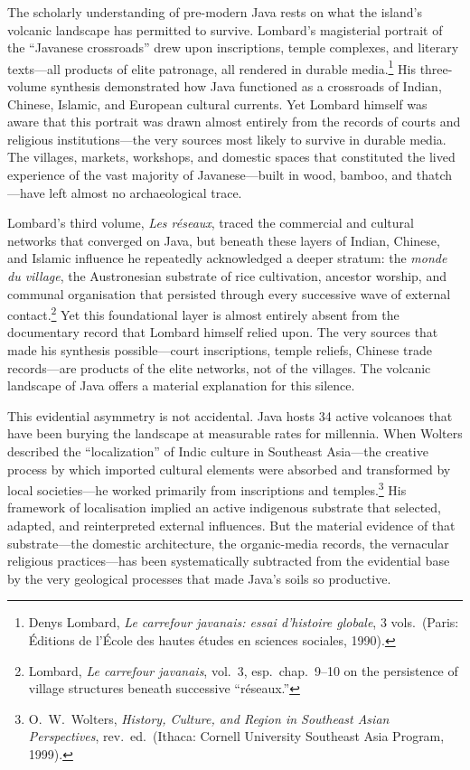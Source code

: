\documentclass[12pt,a4paper]{article}
\begin{document}
The scholarly understanding of pre-modern Java rests on what the island's volcanic landscape has permitted to survive.
Lombard's magisterial portrait of the ``Javanese crossroads'' drew upon inscriptions, temple complexes, and literary texts---all products of elite patronage, all rendered in durable media.\footnote{Denys Lombard, \emph{Le carrefour javanais: essai d'histoire globale}, 3 vols.\ (Paris: \'{E}ditions de l'\'{E}cole des hautes \'{e}tudes en sciences sociales, 1990).}
His three-volume synthesis demonstrated how Java functioned as a crossroads of Indian, Chinese, Islamic, and European cultural currents.
Yet Lombard himself was aware that this portrait was drawn almost entirely from the records of courts and religious institutions---the very sources most likely to survive in durable media.
The villages, markets, workshops, and domestic spaces that constituted the lived experience of the vast majority of Javanese---built in wood, bamboo, and thatch---have left almost no archaeological trace.

Lombard's third volume, \emph{Les r\'{e}seaux}, traced the commercial and cultural networks that converged on Java, but beneath these layers of Indian, Chinese, and Islamic influence he repeatedly acknowledged a deeper stratum: the \emph{monde du village}, the Austronesian substrate of rice cultivation, ancestor worship, and communal organisation that persisted through every successive wave of external contact.\footnote{Lombard, \emph{Le carrefour javanais}, vol.~3, esp.\ chap.~9--10 on the persistence of village structures beneath successive ``r\'{e}seaux.''}
Yet this foundational layer is almost entirely absent from the documentary record that Lombard himself relied upon.
The very sources that made his synthesis possible---court inscriptions, temple reliefs, Chinese trade records---are products of the elite networks, not of the villages.
The volcanic landscape of Java offers a material explanation for this silence.

This evidential asymmetry is not accidental.
Java hosts 34 active volcanoes that have been burying the landscape at measurable rates for millennia.
When Wolters described the ``localization'' of Indic culture in Southeast Asia---the creative process by which imported cultural elements were absorbed and transformed by local societies---he worked primarily from inscriptions and temples.\footnote{O.~W.\ Wolters, \emph{History, Culture, and Region in Southeast Asian Perspectives}, rev.\ ed.\ (Ithaca: Cornell University Southeast Asia Program, 1999).}
His framework of localisation implied an active indigenous substrate that selected, adapted, and reinterpreted external influences.
But the material evidence of that substrate---the domestic architecture, the organic-media records, the vernacular religious practices---has been systematically subtracted from the evidential base by the very geological processes that made Java's soils so productive.
\end{document}
